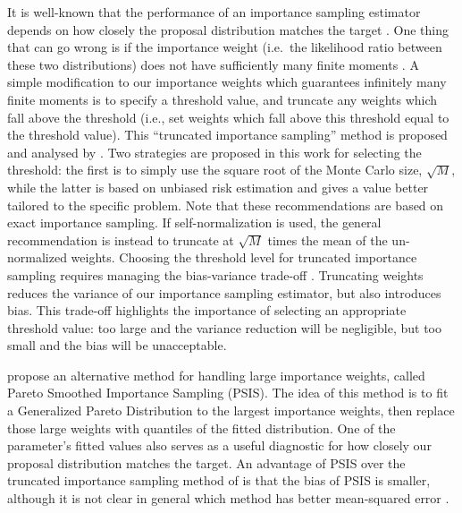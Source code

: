 \documentclass[11pt, oneside]{article}   	%
\begin{document}
It is well-known that the performance of an importance sampling estimator depends on how closely the proposal distribution matches the target \citep{Rob04}. One thing that can go wrong is if the importance weight (i.e.\ the likelihood ratio between these two distributions) does not have sufficiently many finite moments \citep{Aga17}. A simple modification to our importance weights which guarantees infinitely many finite moments is to specify a threshold value, and truncate any weights which fall above the threshold (i.e., set weights which fall above this threshold equal to the threshold value). This ``truncated importance sampling'' method is proposed and analysed by \citet{Ion08}. Two strategies are proposed in this work for selecting the threshold: the first is to simply use the square root of the Monte Carlo size, $\sqrt{M}$, while the latter is based on unbiased risk estimation and gives a value better tailored to the specific problem. Note that these recommendations are based on exact importance sampling. If self-normalization is used, the general recommendation is instead to truncate at $\sqrt{M}$ times the mean of the un-normalized weights. Choosing the threshold level for truncated importance sampling requires managing the bias-variance trade-off \citep{Has09}. Truncating weights reduces the variance of our importance sampling estimator, but also introduces bias. This trade-off highlights the importance of selecting an appropriate threshold value: too large and the variance reduction will be negligible, but too small and the bias will be unacceptable.

\citet{Veh22} propose an alternative method for handling large importance weights, called Pareto Smoothed Importance Sampling (PSIS). The idea of this method is to fit a Generalized Pareto Distribution to the largest importance weights, then replace those large weights with quantiles of the fitted distribution. One of the parameter's fitted values also serves as a useful diagnostic for how closely our proposal distribution matches the target. An advantage of PSIS over the truncated importance sampling method of \citet{Ion08} is that the bias of PSIS is smaller, although it is not clear in general which method has better mean-squared error \citep[see][for extensive numerical comparisons]{Veh22}.  
\end{document}
